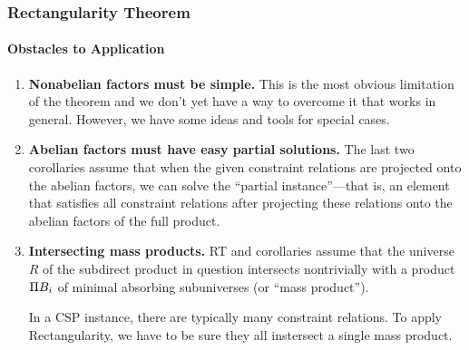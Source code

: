 \documentclass[xcolor=dvipsnames,9pt,hide notes,mathserif]{beamer}
\begin{document}
\begin{frame} \frametitle{Rectangularity Theorem}
  \framesubtitle{Obstacles to Application}

  \begin{enumerate}
  \item<1-> {\bf Nonabelian factors must be simple.}
    This is the most obvious limitation of the theorem and
    we don't yet have a way to overcome it that works in general.
    However, we have some ideas and tools for special cases.

  \item<2-> {\bf Abelian factors must have easy partial solutions.}
    The last two corollaries assume that
    when the given constraint relations are projected onto the abelian factors,
    we can solve the ``partial instance''---that is, an element that satisfies all
    constraint relations after projecting these relations onto the abelian
    factors of the full product. 

  \item<3-> {\bf Intersecting mass products.}
    RT and corollaries assume that the universe $R$ of the subdirect
    product in question intersects nontrivially
    with a product $\Pi B_i$ of minimal absorbing subuniverses
    (or ``mass product'').

    \bigskip
    In a CSP instance, there are typically many constraint relations.
    To apply Rectangularity, we have to be sure they all instersect
    a single mass product.
  \end{enumerate}

\end{frame}
\end{document}
